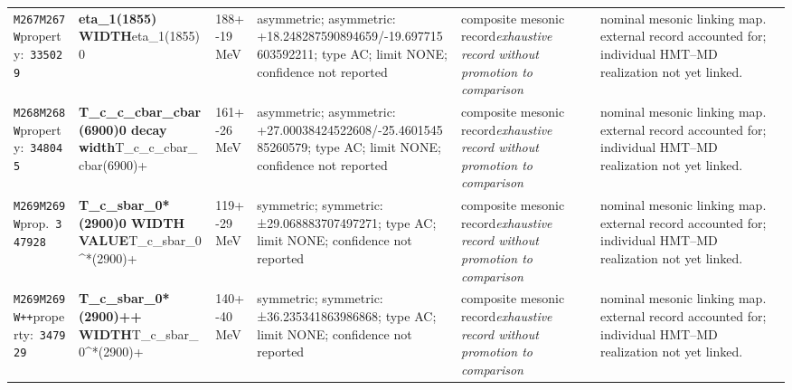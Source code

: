 \begin{landscape}
\begin{longtable}{L{1.85cm}L{4.45cm}L{2.35cm}L{4.05cm}L{3.35cm}L{7.15cm}}
\texttt{M267}\newline \texttt{M267W}\newline property:\ \texttt{335029} & \textbf{eta\_\allowbreak{}1(1855) WIDTH}\newline eta\_\allowbreak{}1(1855)0 & 188+-19\,MeV & asymmetric; asymmetric: +18.248287590894659/-19.697715603592211; type AC; limit NONE; confidence not reported & composite mesonic record\newline \emph{exhaustive record without promotion to comparison} & nominal mesonic linking map. external record accounted for; individual HMT--MD realization not yet linked. \\
\texttt{M268}\newline \texttt{M268W}\newline property:\ \texttt{348045} & \textbf{T\_\allowbreak{}c\_\allowbreak{}c\_\allowbreak{}cbar\_\allowbreak{}cbar(6900)0 decay width}\newline T\_\allowbreak{}c\_\allowbreak{}c\_\allowbreak{}cbar\_\allowbreak{}cbar(6900)+ & 161+-26\,MeV & asymmetric; asymmetric: +27.00038424522608/-25.460154585260579; type AC; limit NONE; confidence not reported & composite mesonic record\newline \emph{exhaustive record without promotion to comparison} & nominal mesonic linking map. external record accounted for; individual HMT--MD realization not yet linked. \\
\texttt{M269}\newline \texttt{M269W}\newline prop.\ \texttt{347928} & \textbf{T\_\allowbreak{}c\_\allowbreak{}sbar\_\allowbreak{}0*(2900)0 WIDTH VALUE}\newline T\_\allowbreak{}c\_\allowbreak{}sbar\_\allowbreak{}0\textasciicircum{}*(2900)+ & 119+-29\,MeV & symmetric; symmetric: ±29.068883707497271; type AC; limit NONE; confidence not reported & composite mesonic record\newline \emph{exhaustive record without promotion to comparison} & nominal mesonic linking map. external record accounted for; individual HMT--MD realization not yet linked. \\
\texttt{M269}\newline \texttt{M269W++}\newline property:\ \texttt{347929} & \textbf{T\_\allowbreak{}c\_\allowbreak{}sbar\_\allowbreak{}0*(2900)++ WIDTH}\newline T\_\allowbreak{}c\_\allowbreak{}sbar\_\allowbreak{}0\textasciicircum{}*(2900)+ & 140+-40\,MeV & symmetric; symmetric: ±36.235341863986868; type AC; limit NONE; confidence not reported & composite mesonic record\newline \emph{exhaustive record without promotion to comparison} & nominal mesonic linking map. external record accounted for; individual HMT--MD realization not yet linked. \\

\end{longtable}
\end{landscape}
